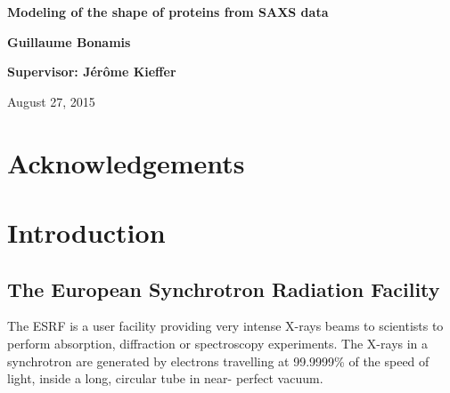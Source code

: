 \documentclass[a4paper, 11pt]{report}
\begin{document}
\begin{titlepage}
    \parindent=0pt
    \hrulefill
    \begin{center}\bfseries\Huge
        Modeling of the shape of proteins from SAXS data
    \end{center}

    \hrulefill
    \vspace*{1cm}
    \begin{center}\bfseries\Large           %
        Guillaume Bonamis
    \end{center}

    \begin{center}\bfseries\Large           %
        Supervisor: J\'er\^ome Kieffer
    \end{center}

    \begin{flushright}
        August 27, 2015
    \end{flushright}   
    
\end{titlepage}


\chapter*{Acknowledgements}


\tableofcontents
{}


\chapter{Introduction}

\section{The European Synchrotron Radiation Facility}

The ESRF is a user facility providing very intense X-rays beams to scientists to
perform absorption, diffraction or spectroscopy experiments.
The X-rays in a synchrotron are generated by electrons travelling at 
99.9999\% of the speed of light, inside a long, circular tube in near-
perfect vacuum.\\
\end{document}
